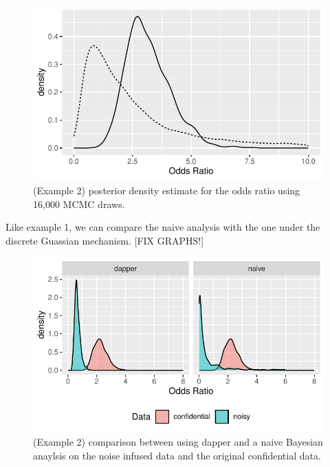 \begin{figure}

{\centering \includegraphics{dppaper_files/figure-latex/post-or-density-dg-1} 

}

\caption{(Example 2) posterior density estimate for the odds ratio using 16,000 MCMC draws.}\label{fig:post-or-density-dg}
\end{figure}

Like example 1, we can compare the naive analysis with the one under
the discrete Guassian mechanism. {[}FIX GRAPHS!{]}

\begin{figure}

{\centering \includegraphics{dppaper_files/figure-latex/post-or-compare-dg-1} 

}

\caption{(Example 2) comparison between using dapper and a naive Bayesian anaylsis on the
noise infused data and the original confidential data.}\label{fig:post-or-compare-dg}
\end{figure}

